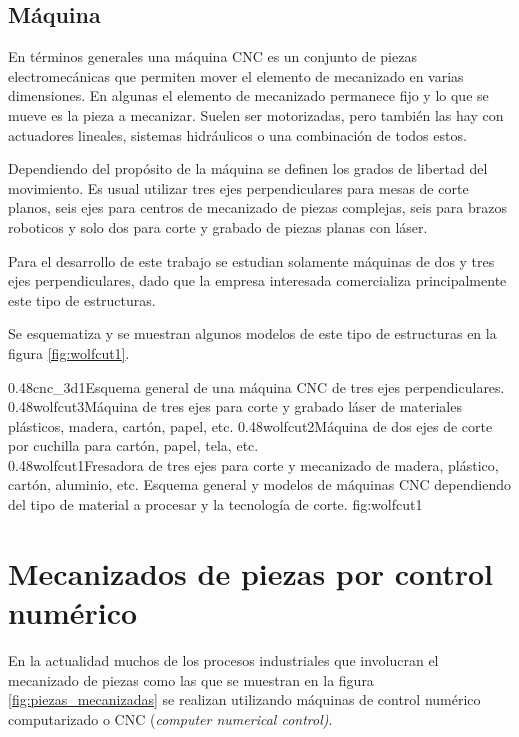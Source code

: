 \subsection{Máquina}
En términos generales una máquina CNC es un conjunto de piezas electromecánicas que permiten mover el elemento de mecanizado en varias dimensiones.
En algunas el elemento de mecanizado permanece fijo y lo que se mueve es la pieza a mecanizar.
Suelen ser motorizadas, pero también las hay con actuadores lineales, sistemas hidráulicos o una combinación de todos estos.\par
Dependiendo del propósito de la máquina se definen los grados de libertad del movimiento.
Es usual utilizar tres ejes perpendiculares para mesas de corte planos, seis ejes para centros de mecanizado de piezas complejas, seis para brazos roboticos y solo dos para corte y grabado de piezas planas con láser.\par
Para el desarrollo de este trabajo se estudian solamente máquinas de dos y tres ejes perpendiculares, dado que la empresa interesada comercializa principalmente este tipo de estructuras. \par
Se esquematiza y se muestran algunos modelos de este tipo de estructuras en la figura \ref{fig:wolfcut1}.

\subfigtwotwo
{0.48}{cnc_3d1}{Esquema general de una máquina CNC de tres ejes perpendiculares.\\ \vphantom{1}}
            {0.48}{wolfcut3}{Máquina de tres ejes para corte y grabado láser de materiales plásticos, madera, cartón, papel, etc.}
            {0.48}{wolfcut2}{Máquina de dos ejes de corte por cuchilla para cartón, papel, tela, etc.\\ \vphantom{1}}
            {0.48}{wolfcut1}{Fresadora de tres ejes para corte y mecanizado de madera, plástico, cartón, aluminio, etc.}
            {Esquema general y modelos de máquinas CNC dependiendo del tipo de material a procesar y la tecnología de corte.}
            {fig:wolfcut1}


\section{Mecanizados de piezas por control numérico}

En la actualidad muchos de los procesos industriales que involucran el mecanizado de piezas como las que se muestran en la figura \ref{fig:piezas_mecanizadas} se realizan utilizando máquinas de control numérico computarizado o CNC \citep{WEBSITE:cncwiki} (\textit{computer numerical control)}.

